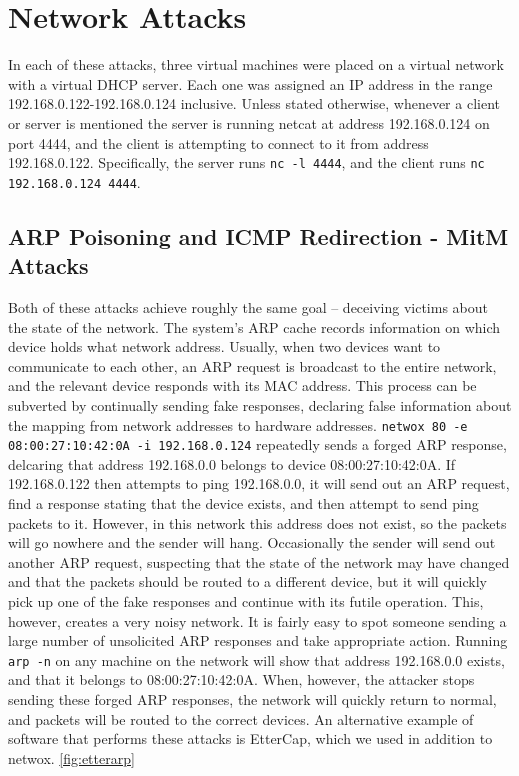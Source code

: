 \section{Network Attacks}


In each of these attacks, three virtual machines were placed on a virtual network with a virtual DHCP server. Each one
was assigned an IP address in the range 192.168.0.122-192.168.0.124 inclusive. Unless stated otherwise, whenever a
client or server is mentioned the server is running netcat at address 192.168.0.124 on port 4444, and the client is
attempting to connect to it from address 192.168.0.122. Specifically, the server runs {\tt nc -l 4444}, and the
client runs {\tt nc 192.168.0.124 4444}.

\subsection{ARP Poisoning and ICMP Redirection - MitM Attacks}

Both of these attacks achieve roughly the same goal -- deceiving victims about the state of the network. The system's
ARP cache records information on which device holds what network address. Usually, when two devices want to communicate
to each other, an ARP request is broadcast to the entire network, and the relevant device responds with its MAC address.
This process can be subverted by continually sending fake responses, declaring false information about the mapping from
network addresses to hardware addresses. {\tt netwox 80 -e 08:00:27:10:42:0A -i 192.168.0.124} repeatedly sends a forged
ARP response, delcaring that address 192.168.0.0 belongs to device 08:00:27:10:42:0A. If 192.168.0.122 then attempts to
ping 192.168.0.0, it will send out an ARP request, find a response stating that the device exists, and then attempt to
send ping packets to it. However, in this network this address does not exist, so the packets will go nowhere and the
sender will hang. Occasionally the sender will send out another ARP request, suspecting that the state of the network
may have changed and that the packets should be routed to a different device, but it will quickly pick up one of the
fake responses and continue with its futile operation. This, however, creates a very noisy network. It is fairly easy to
spot someone sending a large number of unsolicited ARP responses and take appropriate action. Running {\tt arp -n} on
any machine on the network will show that address 192.168.0.0 exists, and that it belongs to 08:00:27:10:42:0A. When,
however, the attacker stops sending these forged ARP responses, the network will quickly return to normal, and packets
will be routed to the correct devices.
An alternative example of software that performs these attacks is EtterCap, which we used in addition to netwox.
\ref{fig:etterarp}

